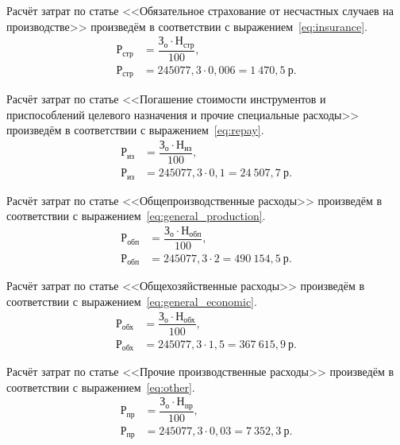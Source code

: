 Расчёт затрат по статье <<Обязательное страхование от несчастных случаев
на производстве>> произведём в соответствии с выражением~\ref{eq:insurance}.
\begin{align}
  \label{eq:insurance}
  \text{Р}_{\text{стр}} &= \dfrac{\text{З}_{\text{о}} \cdot
    \text{Н}_{\text{стр}}}{100}, \\
  \text{Р}_{\text{стр}} &= 245077{,}3 \cdot 0{,}006 =
    1~470{,}5 \: \text{р.} \nonumber
\end{align}

Расчёт затрат по статье <<Погашение стоимости инструментов и приспособлений
целевого назначения и прочие специальные расходы>>
произведём в соответствии с выражением~\ref{eq:repay}.
\begin{align}
  \label{eq:repay}
  \text{Р}_{\text{из}} &= \dfrac{\text{З}_{\text{о}} \cdot
    \text{Н}_{\text{из}}}{100}, \\
  \text{Р}_{\text{из}} &= 245077{,}3 \cdot 0{,}1 =
    24~507{,}7 \: \text{р.} \nonumber
\end{align}

Расчёт затрат по статье <<Общепроизводственные расходы>>
произведём в соответствии с выражением~\ref{eq:general_production}.
\begin{align}
  \label{eq:general_production}
  \text{Р}_{\text{обп}} &= \dfrac{\text{З}_{\text{о}} \cdot
    \text{Н}_{\text{обп}}}{100}, \\
  \text{Р}_{\text{обп}} &= 245077{,}3 \cdot 2 =
    490~154{,}5 \: \text{р.} \nonumber
\end{align}

Расчёт затрат по статье <<Общехозяйственные расходы>>
произведём в соответствии с выражением~\ref{eq:general_economic}.
\begin{align}
  \label{eq:general_economic}
  \text{Р}_{\text{обх}} &= \dfrac{\text{З}_{\text{о}} \cdot
    \text{Н}_{\text{обх}}}{100}, \\
  \text{Р}_{\text{обх}} &= 245077{,}3 \cdot 1{,}5 =
    367~615{,}9 \: \text{р.} \nonumber
\end{align}

Расчёт затрат по статье <<Прочие производственные расходы>>
произведём в соответствии с выражением~\ref{eq:other}.
\begin{align}
  \label{eq:other}
  \text{Р}_{\text{пр}} &= \dfrac{\text{З}_{\text{о}} \cdot
    \text{Н}_{\text{пр}}}{100}, \\
  \text{Р}_{\text{пр}} &= 245077{,}3 \cdot 0{,}03 =
    7~352{,}3 \: \text{р.} \nonumber
\end{align}

